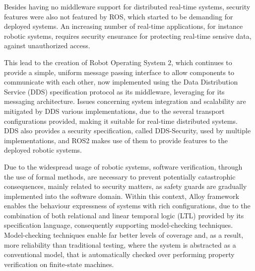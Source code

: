 Besides having no middleware support for distributed real-time systems, security features were also not featured by ROS, which started to be demanding for deployed systems. An increasing number of real-time applications, for instance robotic systems, requires security ensurance for protecting real-time sensive data, against unauthorized access. \cite{lin2009static} 

This lead to the creation of Robot Operating System 2, which continues to provide a simple, uniform message passing interface to allow components to communicate with each other, now implemented using the Data Distribution Service (DDS) \cite{3} specification protocol as its middleware, leveraging for its messaging architecture. Issues concerning system integration and scalability are mitigated by DDS various implementations, due to the several transport configurations provided, making it suitable for real-time distributed systems. DDS also provides a security specification, called DDS-Security, used by multiple implementations, and ROS2 makes use of them to provide features to the deployed robotic systems. \cite{8442103}

Due to the widespread usage of robotic systems, software verification, through the use of formal methods, are necessary to prevent potentially catastrophic consequences, mainly related to security matters, as safety guards are gradually implemented into the software domain. \cite{carvalho2020analysis} Within this context, Alloy \cite{alloy-DJ, lwspecification} framework enables the behaviour expressness of systems with rich configurations, due to the combination of both relational and linear temporal logic (LTL) provided by its specification language, consequently supporting model-checking techniques. Model-checking techniques enable far better levels of coverage and, as a result, more reliability than traditional testing, where the system is abstracted as a conventional model, that is automatically checked over performing property verification on finite-state machines. \cite{beyer2017software}

